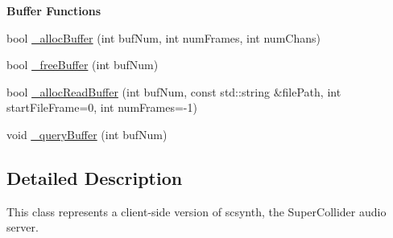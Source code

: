 \begin{Indent}{\bf Buffer Functions}\par
\begin{DoxyCompactItemize}
\item 
bool \hyperlink{classColliderPlusPlus_1_1Client__Server_ad8a85d8a8f25f1f1b0133078dbd4c4d3}{\-\_\-alloc\-Buffer} (int buf\-Num, int num\-Frames, int num\-Chans)
\item 
bool \hyperlink{classColliderPlusPlus_1_1Client__Server_a5dd10ce383bba35133c7057dee000170}{\-\_\-free\-Buffer} (int buf\-Num)
\item 
bool \hyperlink{classColliderPlusPlus_1_1Client__Server_a293596d6659f4b6bfb5d46e2b310cfa2}{\-\_\-alloc\-Read\-Buffer} (int buf\-Num, const std\-::string \&file\-Path, int start\-File\-Frame=0, int num\-Frames=-\/1)
\item 
void \hyperlink{classColliderPlusPlus_1_1Client__Server_ad4f4ff49145681381f451ba91a6c07e2}{\-\_\-query\-Buffer} (int buf\-Num)
\end{DoxyCompactItemize}
\end{Indent}


\subsection{Detailed Description}
This class represents a client-\/side version of scsynth, the Super\-Collider audio server. 

